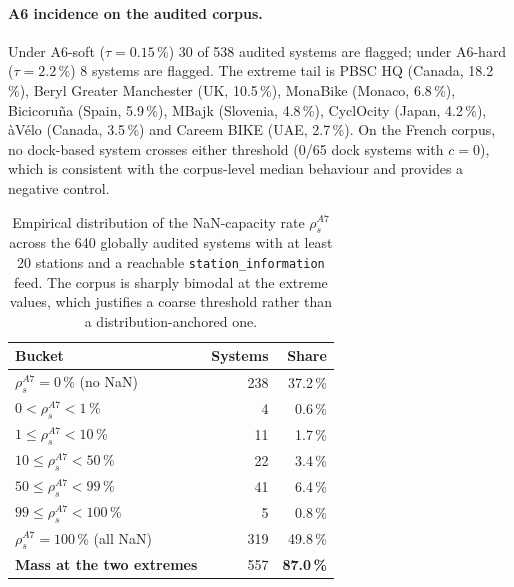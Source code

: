 \documentclass[11pt,a4paper]{article}
\begin{document}
\paragraph{A6 incidence on the audited corpus.}
Under A6-soft ($\tau = 0.15\,\%$) 30 of 538 audited systems are
flagged; under A6-hard ($\tau = 2.2\,\%$) 8 systems are flagged. The
extreme tail is PBSC HQ (Canada, 18.2\,\%), Beryl Greater Manchester
(UK, 10.5\,\%), MonaBike (Monaco, 6.8\,\%), Bicicoru\~na (Spain,
5.9\,\%), MBajk (Slovenia, 4.8\,\%), CyclOcity (Japan, 4.2\,\%),
\`aV\'elo (Canada, 3.5\,\%) and Careem BIKE (UAE, 2.7\,\%). On the
French corpus, no dock-based system crosses either threshold
(0/65 dock systems with $c = 0$), which is consistent with the
corpus-level median behaviour and provides a negative control.

\begin{table}[ht]
\centering
\caption{Empirical distribution of the NaN-capacity rate
$\rho_s^{A7}$ across the 640 globally audited systems with at least
20 stations and a reachable \texttt{station\_information} feed.
The corpus is sharply bimodal at the extreme values, which justifies
a coarse threshold rather than a distribution-anchored one.}
\label{tab:a7-distribution}
\small
\begin{tabular}{@{}lrr@{}}
\toprule
\textbf{Bucket} & \textbf{Systems} & \textbf{Share}\\
\midrule
$\rho_s^{A7} = 0$\,\% (no NaN)        & 238 & 37.2\,\% \\
$0 < \rho_s^{A7} < 1$\,\%              &   4 &  0.6\,\% \\
$1 \leq \rho_s^{A7} < 10$\,\%          &  11 &  1.7\,\% \\
$10 \leq \rho_s^{A7} < 50$\,\%         &  22 &  3.4\,\% \\
$50 \leq \rho_s^{A7} < 99$\,\%         &  41 &  6.4\,\% \\
$99 \leq \rho_s^{A7} < 100$\,\%        &   5 &  0.8\,\% \\
$\rho_s^{A7} = 100$\,\% (all NaN)      & 319 & 49.8\,\% \\
\midrule
\textbf{Mass at the two extremes} & 557 & \textbf{87.0\,\%} \\
\bottomrule
\end{tabular}
\end{table}
\end{document}
